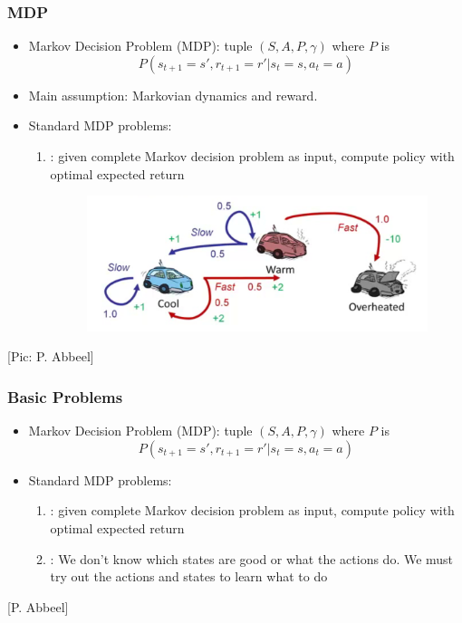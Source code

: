 \documentclass[handout]{beamer}
\begin{document}
\begin{frame}\frametitle{MDP}\small
\begin{itemize}
\item Markov Decision Problem (MDP): tuple $(S,A,P,\gamma)$ where $P$ is
\[
P(s_{t+1}=s', r_{t+1}=r' | s_t = s, a_t = a)
\]
\item Main assumption: Markovian dynamics and reward.
\item Standard MDP problems:
\begin{enumerate}
\item  {}: given complete Markov decision problem as input, compute policy with optimal expected return
\begin{figure}
\includegraphics[width=0.7\linewidth]{Figures/rll6} 
\end{figure}
\end{enumerate}
\end{itemize}
\scriptsize [Pic: P. Abbeel]
\end{frame}


\begin{frame}\frametitle{Basic Problems}\small
\begin{itemize}
\item Markov Decision Problem (MDP): tuple $(S,A,P,\gamma)$ where $P$ is
\[
P(s_{t+1}=s', r_{t+1}=r' | s_t = s, a_t = a)
\]
\item Standard MDP problems:
\begin{enumerate}
\item  {}: given complete Markov decision problem as input, compute policy with optimal expected return\\[1mm]
\item {}: We don't know which states are good or what the actions do. We must try out the actions and states to learn what to do
\end{enumerate}
\end{itemize}
\vspace{28mm}

\scriptsize [P. Abbeel]
\end{frame}
\end{document}
